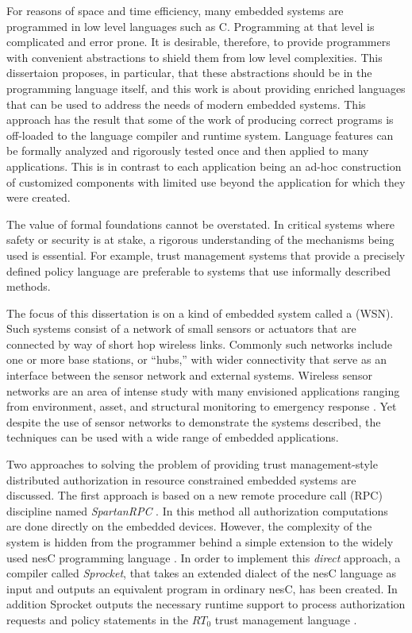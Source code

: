 For reasons of space and time efficiency, many embedded systems are programmed in low level
languages such as C. Programming at that level is complicated and error prone. It is desirable,
therefore, to provide programmers with convenient abstractions to shield them from low level
complexities. This dissertaion proposes, in particular, that these abstractions should be in the
programming language itself, and this work is about providing enriched languages that can be
used to address the needs of modern embedded systems. This  approach has
the result that some of the work of producing correct programs is off-loaded to the language
compiler and runtime system. Language features can be formally analyzed and rigorously tested
once and then applied to many applications. This is in contrast to each application being an
ad-hoc construction of customized components with limited use beyond the application for which
they were created. 

The value of formal foundations cannot be overstated. In critical systems where safety or
security is at stake, a rigorous understanding of the mechanisms being used is essential. For
example, trust management systems that provide a precisely defined policy language are
preferable to systems that use informally described methods.

The focus of this dissertation is on a kind of embedded system called a  (WSN). Such systems consist of a network of small sensors or actuators that are
connected by way of short hop wireless links. Commonly such networks include one or more base
stations, or ``hubs,'' with wider connectivity that serve as an interface between the sensor
network and external systems. Wireless sensor networks are an area of intense study with many
envisioned applications ranging from environment, asset, and structural monitoring to emergency
response \cite{Culler:2004:GEI:1018015.1018072,1038146}. Yet despite the use of sensor networks
to demonstrate the systems described, the techniques can be used with a wide range of embedded
applications.

Two approaches to solving the problem of providing trust management-style distributed
authorization in resource constrained embedded systems are discussed. The first approach is
based on a new remote procedure call (RPC) discipline named \textit{SpartanRPC}
\cite{chapin-skalka-SpartanRPC,chapin-skalka-SpartanRPCTR}. In this method all authorization
computations are done directly on the embedded devices. However, the complexity of the system is
hidden from the programmer behind a simple extension to the widely used nesC programming
language \cite{Gay-nesC-2003}. In order to implement this \emph{direct} approach, a compiler
called \textit{Sprocket}, that takes an extended dialect of the nesC language as input and
outputs an equivalent program in ordinary nesC, has been created. In addition Sprocket outputs
the necessary runtime support to process authorization requests and policy statements in the
$RT_0$ trust management language \cite{Li:DRBTMF,Li:RRBTMF}.

